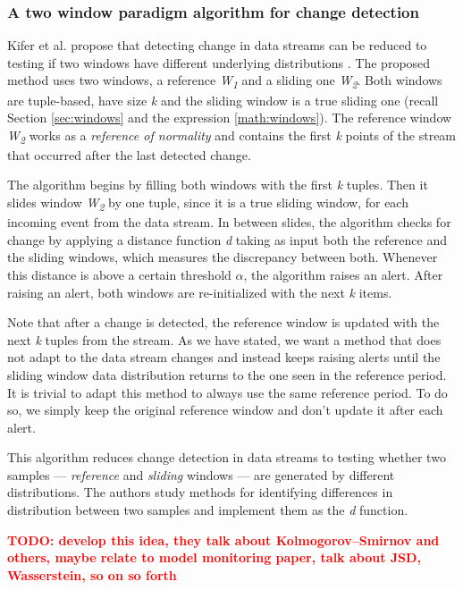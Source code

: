 \subsubsection{A two window paradigm algorithm for change detection}
Kifer et al. propose that detecting change in data streams can be reduced to testing if two windows have different underlying distributions \cite{Kifer-Detecting-Change}. The proposed method uses two windows, a reference \textit{W\textsubscript{1}} and a sliding one \textit{W\textsubscript{2}}. Both windows are tuple-based, have size \textit{k} and the sliding window is a true sliding one (recall Section \ref{sec:windows} and the expression \ref{math:windows}). The reference window \textit{W\textsubscript{2}} works as a \textit{reference of normality} and contains the first \textit{k} points of the stream that occurred after the last detected change.

The algorithm begins by filling both windows with the first \textit{k} tuples. Then it slides window \textit{W\textsubscript{2}} by one tuple, since it is a true sliding window, for each incoming event from the data stream. In between slides, the algorithm checks for change by applying a distance function \textit{d} taking as input both the reference and the sliding windows, which measures the discrepancy between both. Whenever this distance is above a certain threshold $\alpha$, the algorithm raises an alert. After raising an alert, both windows are re-initialized with the next \textit{k} items.

Note that after a change is detected, the reference window is updated with the next \textit{k} tuples from the stream. As we have stated, we want a method that does not adapt to the data stream changes and instead keeps raising alerts until the sliding window data distribution returns to the one seen in the reference period. It is trivial to adapt this method to always use the same reference period. To do so, we simply keep the original reference window and don't update it after each alert.

This algorithm reduces change detection in data streams to testing whether two samples --- \textit{reference} and \textit{sliding} windows --- are generated by different distributions. The authors study methods for identifying differences in distribution between two samples and implement them as the \textit{d} function. 

\textcolor{red}{\textbf{TODO: develop this idea, they talk about Kolmogorov–Smirnov and others, maybe relate to model monitoring paper, talk about JSD, Wasserstein, so on so forth}}


